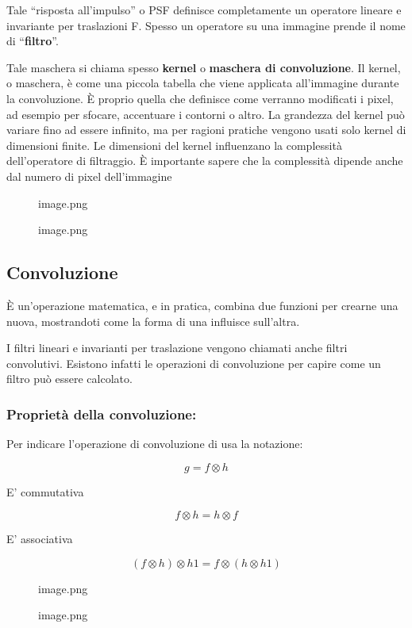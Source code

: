 \documentclass[
]{article}
\begin{document}
Tale ``risposta all'impulso'' o PSF definisce completamente un operatore lineare e invariante per traslazioni F. Spesso un operatore su una immagine prende il nome di ``\textbf{filtro}''.

Tale maschera si chiama spesso \textbf{kernel} o \textbf{maschera di convoluzione}.
Il kernel, o maschera, è come una piccola tabella che viene applicata all'immagine durante la convoluzione. È proprio quella che definisce come verranno modificati i pixel, ad esempio per sfocare, accentuare i contorni o altro.
La grandezza del kernel può variare fino ad essere infinito, ma per ragioni pratiche vengono usati solo kernel di dimensioni finite.
Le dimensioni del kernel influenzano la complessità dell'operatore di filtraggio.
È importante sapere che la complessità dipende anche dal numero di pixel dell'immagine

\begin{figure}
\centering
{image.png}
\caption{image.png}
\end{figure}

\hypertarget{convoluzione}{%
\subsection{Convoluzione}\label{convoluzione}}

È un'operazione matematica, e in pratica, combina due funzioni per crearne una nuova, mostrandoti come la forma di una influisce sull'altra.

I filtri lineari e invarianti per traslazione vengono chiamati anche filtri convolutivi.
Esistono infatti le operazioni di convoluzione per capire come un filtro può essere calcolato.

\hypertarget{proprietuxe0-della-convoluzione}{%
\subsubsection{Proprietà della convoluzione:}\label{proprietuxe0-della-convoluzione}}

Per indicare l'operazione di convoluzione di usa la notazione:

\[
g = f \otimes h
\]

E' commutativa

\[
f \otimes h = h \otimes f
\]

E' associativa

\[
(f \otimes h) \otimes h1 = f \otimes (h \otimes h1)
\]

\begin{figure}
\centering
{image.png}
\caption{image.png}
\end{figure}
\end{document}
